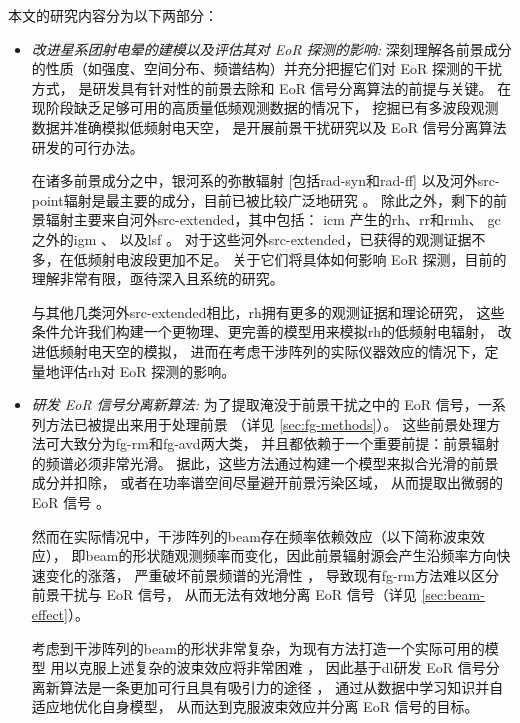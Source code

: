 本文的研究内容分为以下两部分：
\begin{itemize}
\item
\emph{改进星系团射电晕的建模以及评估其对 EoR 探测的影响:}
深刻理解各前景成分的性质（如强度、空间分布、频谱结构）并充分把握它们对 EoR 探测的干扰方式，
是研发具有针对性的前景去除和 EoR 信号分离算法的前提与关键。
在现阶段缺乏足够可用的高质量低频观测数据的情况下，
挖掘已有多波段观测数据并准确模拟低频射电天空，
是开展前景干扰研究以及 EoR 信号分离算法研发的可行办法。

\hspace{2\ccwd}%
在诸多前景成分之中，银河系的弥散辐射 [包括\ac{rad-syn}和\ac{rad-ff}]
以及河外\ac{src-point}辐射是最主要的成分，目前已被比较广泛地研究
\cite{shaver1999,diMatteo2004,gleser2008,liu2012,murray2017,spinelli2018}。
除此之外，剩下的前景辐射主要来自河外\ac{src-extended}，其中包括：
\ac{icm} \cite{feretti2012} 产生的\ac{rh}、\ac{rr}和\ac{rmh}、
\ac{gc}之外的\ac{igm} \cite{keshet2004}、
以及\ac{lsf} \cite{vazza2015}。
对于这些河外\ac{src-extended}，已获得的观测证据不多，在低频射电波段更加不足。
关于它们将具体如何影响 EoR 探测，目前的理解非常有限，亟待深入且系统的研究。

\hspace{2\ccwd}%
与其他几类河外\ac{src-extended}相比，\ac{rh}拥有更多的观测证据和理论研究，
这些条件允许我们构建一个更物理、更完善的模型用来模拟\ac{rh}的低频射电辐射，
改进低频射电天空的模拟，
进而在考虑干涉阵列的实际仪器效应的情况下，定量地评估\ac{rh}对 EoR 探测的影响。

\item
\emph{研发 EoR 信号分离新算法:}
为了提取淹没于前景干扰之中的 EoR 信号，一系列方法已被提出来用于处理前景
（详见 \autoref{sec:fg-methods}）。
这些前景处理方法可大致分为\ac{fg-rm}和\ac{fg-avd}两大类，
并且都依赖于一个重要前提：前景辐射的频谱必须非常光滑。
据此，这些方法通过构建一个模型来拟合光滑的前景成分并扣除，
或者在功率谱空间尽量避开前景污染区域，
从而提取出微弱的 EoR 信号 \cite{chapman2016}。

\hspace{2\ccwd}%
然而在实际情况中，干涉阵列的\ac{beam}存在频率依赖效应（以下简称波束效应），
即\ac{beam}的形状随观测频率而变化，因此前景辐射源会产生沿频率方向快速变化的涨落，
严重破坏前景频谱的光滑性 \cite{liu2009ps}，
导致现有\ac{fg-rm}方法难以区分前景干扰与 EoR 信号，
从而无法有效地分离 EoR 信号（详见 \autoref{sec:beam-effect}）。

\hspace{2\ccwd}%
考虑到干涉阵列的\ac{beam}的形状非常复杂，为现有方法打造一个实际可用的模型
用以克服上述复杂的波束效应将非常困难 \cite{lochner2015}，
因此基于\ac{dl}研发 EoR 信号分离新算法是一条更加可行且具有吸引力的途径
\cite{herbel2018,vafaeiSadr2019}，
通过从数据中学习知识并自适应地优化自身模型，
从而达到克服波束效应并分离 EoR 信号的目标。

\end{itemize}

